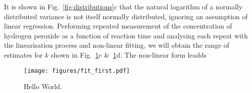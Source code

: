 \documentclass[reprint,superscriptaddress,nobibnotes,amsmath,amssymb]{revtex4-2}
\begin{document}
It is shown in Fig.~\ref{fig:distributions}c that the natural logarithm of a normally distributed variance is not itself normally distributed, ignoring an assumption of linear regression.
Performing repeated measurement of the concentration of hydrogen peroxide as a function of reaction time and analysing each repeat with the linearisation process and non-linear fitting, we will obtain the range of estimates for $k$ shown in Fig.~\ref{fig:fit_first}c \&~\ref{fig:fit_first}d.
The non-linear form leadds
%
\begin{figure}
  \texttt{[image: figures/fit\_first.pdf]}
  \caption{
    Hello World.
    }
  \label{fig:fit_first}
\end{figure}
%









\end{document}
